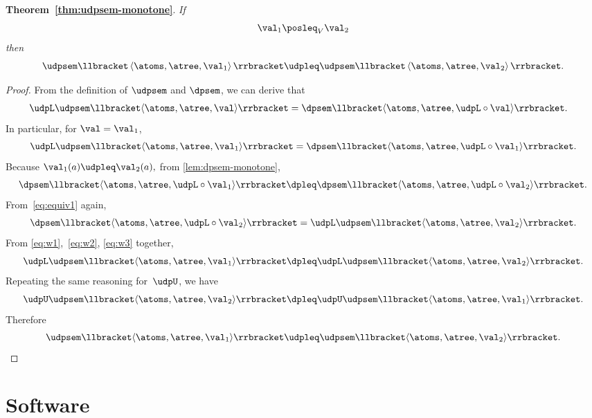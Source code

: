 \textbf{Theorem~\ref{thm:udpsem-monotone}}. \emph{If
  \[
    \val_{1}\posleq_{V}\val_{2}
  \]
  then
  \[
    \udpsem\llbracket\left\langle \atoms,\atree,\val_{1}\right\rangle \rrbracket\udpleq\udpsem\llbracket\left\langle \atoms,\atree,\val_{2}\right\rangle \rrbracket.
  \]
}
\begin{proof}
  From the definition of $\udpsem$ and $\dpsem$, we can derive that
  \begin{align}
    \udpL\udpsem\llbracket\langle\atoms,\atree,\val\rangle\rrbracket & =\dpsem\llbracket\langle\atoms,\atree,\udpL\circ\val\rangle\rrbracket.\label{eq:equiv1}
  \end{align}
  In particular, for $\val=\val_{1}$,
  \begin{equation}
    \udpL\udpsem\llbracket\langle\atoms,\atree,\val_{1}\rangle\rrbracket=\dpsem\llbracket\langle\atoms,\atree,\udpL\circ\val_{1}\rangle\rrbracket.\label{eq:w1}
  \end{equation}
  Because $\val_{1}(a)\udpleq\val_{2}(a),$ from \cref{lem:dpsem-monotone},
  \begin{equation}
    \dpsem\llbracket\langle\atoms,\atree,\udpL\circ\val_{1}\rangle\rrbracket\dpleq\dpsem\llbracket\langle\atoms,\atree,\udpL\circ\val_{2}\rangle\rrbracket.\label{eq:w2}
  \end{equation}
  From~\cref{eq:equiv1} again,
  \begin{equation}
    \dpsem\llbracket\langle\atoms,\atree,\udpL\circ\val_{2}\rangle\rrbracket=\udpL\udpsem\llbracket\langle\atoms,\atree,\val_{2}\rangle\rrbracket.\label{eq:w3}
  \end{equation}
  From \cref{eq:w1},~\cref{eq:w2}, \cref{eq:w3} together,
  \[
    \udpL\udpsem\llbracket\langle\atoms,\atree,\val_{1}\rangle\rrbracket\dpleq\udpL\udpsem\llbracket\langle\atoms,\atree,\val_{2}\rangle\rrbracket.
  \]
  Repeating the same reasoning for~$\udpU$, we have
  \[
    \udpU\udpsem\llbracket\langle\atoms,\atree,\val_{2}\rangle\rrbracket\dpleq\udpU\udpsem\llbracket\langle\atoms,\atree,\val_{1}\rangle\rrbracket.
  \]
  Therefore
  \[
    \udpsem\llbracket\langle\atoms,\atree,\val_{1}\rangle\rrbracket\udpleq\udpsem\llbracket\langle\atoms,\atree,\val_{2}\rangle\rrbracket.
  \]
\end{proof}

\vfill\pagebreak

\section{Software}

